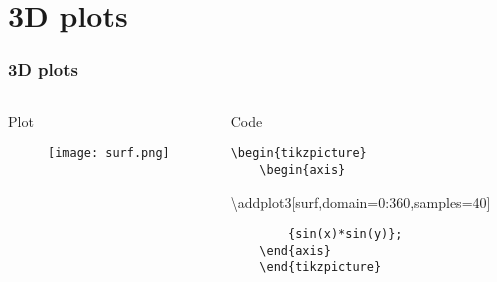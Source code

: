 \documentclass{beamer}
\begin{document}
\section{3D plots}
\begin{frame}[fragile]
\frametitle{3D plots}
\begin{columns}
\begin{block}{Plot}
\begin{figure}[h!]
	\centering
	\texttt{[image: surf.png]}
\end{figure}
\end{block}
\begin{block}{Code}
\tiny{
\begin{verbatim}
\begin{tikzpicture}
	\begin{axis}
\end{verbatim}
		\textbackslash {\color{blue}addplot3[surf,domain=0:360,samples=40]}
\begin{verbatim}
		{sin(x)*sin(y)};
	\end{axis}
	\end{tikzpicture}
\end{verbatim}
}
\end{block}
\end{columns}
\end{frame}
\begin{frame}[fragile]
\vfill
{}
\vfill
\end{frame}
\end{document}
